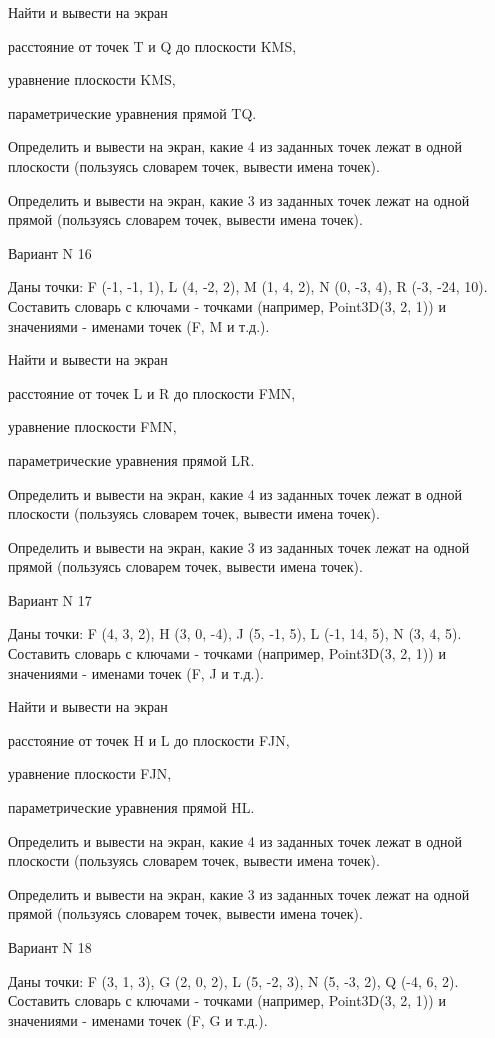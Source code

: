 \documentclass[11pt]{report}
\begin{document}
Найти и вывести на экран


расстояние от точек T и Q до плоскости KMS,


уравнение плоскости KMS,


параметрические уравнения прямой TQ.


Определить и вывести на экран, какие 4 из заданных точек лежат в одной плоскости (пользуясь словарем точек, вывести имена точек).


Определить и вывести на экран, какие 3 из заданных точек лежат на одной прямой (пользуясь словарем точек, вывести имена точек).

\newpage
Вариант N 16

Даны точки: F (-1, -1, 1), L (4, -2, 2), M (1, 4, 2), N (0, -3, 4), R (-3, -24, 10).
Составить словарь с ключами - точками (например, Point3D(3, 2, 1)) и значениями - именами точек (F, M и т.д.).


Найти и вывести на экран


расстояние от точек L и R до плоскости FMN,


уравнение плоскости FMN,


параметрические уравнения прямой LR.


Определить и вывести на экран, какие 4 из заданных точек лежат в одной плоскости (пользуясь словарем точек, вывести имена точек).


Определить и вывести на экран, какие 3 из заданных точек лежат на одной прямой (пользуясь словарем точек, вывести имена точек).

\newpage
Вариант N 17

Даны точки: F (4, 3, 2), H (3, 0, -4), J (5, -1, 5), L (-1, 14, 5), N (3, 4, 5).
Составить словарь с ключами - точками (например, Point3D(3, 2, 1)) и значениями - именами точек (F, J и т.д.).


Найти и вывести на экран


расстояние от точек H и L до плоскости FJN,


уравнение плоскости FJN,


параметрические уравнения прямой HL.


Определить и вывести на экран, какие 4 из заданных точек лежат в одной плоскости (пользуясь словарем точек, вывести имена точек).


Определить и вывести на экран, какие 3 из заданных точек лежат на одной прямой (пользуясь словарем точек, вывести имена точек).

\newpage
Вариант N 18

Даны точки: F (3, 1, 3), G (2, 0, 2), L (5, -2, 3), N (5, -3, 2), Q (-4, 6, 2).
Составить словарь с ключами - точками (например, Point3D(3, 2, 1)) и значениями - именами точек (F, G и т.д.).
\end{document}
